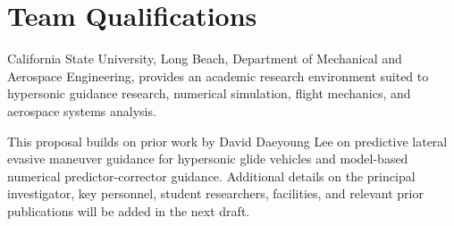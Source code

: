 \section{Team Qualifications}

California State University, Long Beach, Department of Mechanical and Aerospace Engineering, provides an academic research environment suited to hypersonic guidance research, numerical simulation, flight mechanics, and aerospace systems analysis.

This proposal builds on prior work by David Daeyoung Lee on predictive lateral evasive maneuver guidance for hypersonic glide vehicles and model-based numerical predictor-corrector guidance. Additional details on the principal investigator, key personnel, student researchers, facilities, and relevant prior publications will be added in the next draft.
